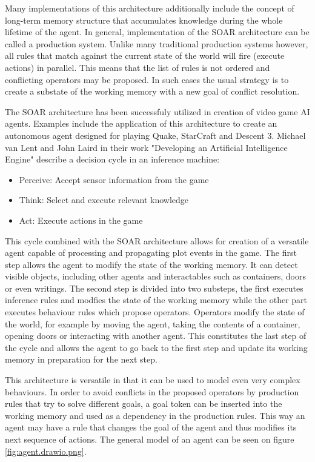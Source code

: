 Many implementations of this architecture additionally include the concept of long-term memory structure that accumulates knowledge during the whole lifetime of the agent.
In general, implementation of the SOAR architecture can be called a production system.
Unlike many traditional production systems however, all rules that match against the current state of the world will fire (execute actions) in parallel.
This means that the list of rules is not ordered and conflicting operators may be proposed.
In such cases the usual strategy is to create a substate of the working memory with a new goal of conflict resolution.

The SOAR architecture has been successfuly utilized in creation of video game AI agents.
Examples include the application of this architecture to create an autonomous agent designed for playing Quake\cite{laird2001knows}, StarCraft\cite{turner2013soar-sc} and Descent 3\cite{van1999developing}.
Michael van Lent and John Laird in their work "Developing an Artificial Intelligence Engine"\cite{van1999developing} describe a decision cycle in an inference machine:

\begin{itemize}
    \item Perceive: Accept sensor information from the game
    \item Think: Select and execute relevant knowledge
    \item Act: Execute actions in the game
\end{itemize}

This cycle combined with the SOAR architecture allows for creation of a versatile agent capable of processing and propagating plot events in the game.
The first step allows the agent to modify the state of the working memory.
It can detect visible objects, including other agents and interactables such as containers, doors or even writings.
The second step is divided into two substeps, the first executes inference rules and modfies the state of the working memory while the other part executes behaviour rules which propose operators.
Operators modify the state of the world, for example by moving the agent, taking the contents of a container, opening doors or interacting with another agent.
This constitutes the last step of the cycle and allows the agent to go back to the first step and update its working memory in preparation for the next step.

This architecture is versatile in that it can be used to model even very complex behaviours.
In order to avoid conflicts in the proposed operators by production rules that try to solve different goals, a goal token can be inserted into the working memory and used as a dependency in the production rules.
This way an agent may have a rule that changes the goal of the agent and thus modifies its next sequence of actions.
The general model of an agent can be seen on figure \ref{fig:agent.drawio.png}.

